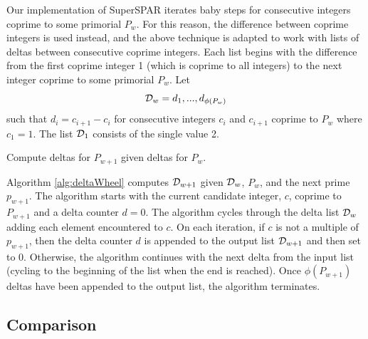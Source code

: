 \documentclass{ucalgthes1}
\theoremstyle{definition}
\newcommand{\algnewline}{\par\noindent\hskip\algorithmicindent}
\begin{document}
Our implementation of SuperSPAR iterates baby steps for consecutive integers coprime to some primorial $P_w$.  For this reason, the difference between coprime integers is used instead, and the above technique is adapted to work with lists of deltas between consecutive coprime integers.  Each list begins with the difference from the first coprime integer 1 (which is coprime to all integers) to the next integer coprime to some primorial $P_w$. Let
\[
	\mathcal D_w = d_1, ..., d_{\phi(P_w)}
\]
such that $d_i = c_{i+1} - c_i$ for consecutive integers $c_i$ and $c_{i+1}$ coprime to $P_w$ where $c_1 = 1$. The list $\mathcal D_1$ consists of the single value 2.

\begin{algorithm}[htb]
\caption{Compute deltas for $P_{w+1}$ given deltas for $P_w$.}
\label{alg:deltaWheel}
\end{algorithm}

Algorithm \ref{alg:deltaWheel} computes $\mathcal D_{w+1}$ given $\mathcal D_w$, $P_w$, and the next prime $p_{w+1}$.  The algorithm starts with the current candidate integer, $c$, coprime to $P_{w+1}$ and a delta counter $d = 0$.  The algorithm cycles through the delta list $\mathcal D_w$ adding each element encountered to $c$.  On each iteration, if $c$ is not a multiple of $p_{w+1}$, then the delta counter $d$ is appended to the output list $\mathcal D_{w+1}$ and then set to 0.  Otherwise, the algorithm continues with the next delta from the input list (cycling to the beginning of the list when the end is reached).  Once $\phi(P_{w+1})$ deltas have been appended to the output list, the algorithm terminates.

\subsection{Comparison}
\end{document}

